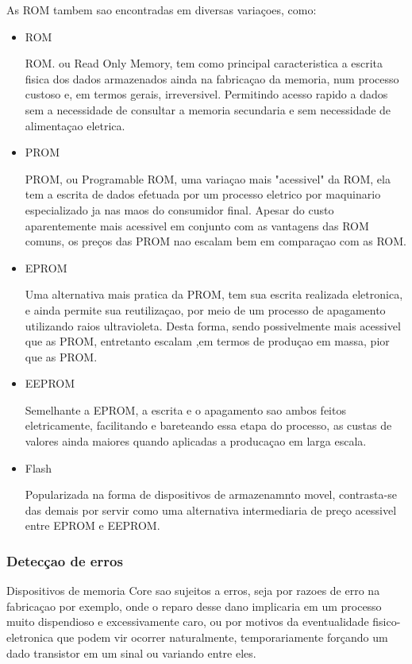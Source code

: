\documentclass[12pt]{article}
\begin{document}
As ROM tambem sao encontradas em diversas variaçoes, como:

\begin{itemize}
    \item ROM 

    ROM. ou Read Only Memory, tem como principal caracteristica a escrita fisica dos dados armazenados ainda na fabricaçao da memoria, num processo custoso e, em termos gerais, irreversivel. Permitindo acesso rapido a dados sem a necessidade de consultar a memoria secundaria e sem necessidade de alimentaçao eletrica.

    \item PROM

    PROM, ou Programable ROM, uma variaçao mais "acessivel" da ROM, ela tem a escrita de dados efetuada por um processo eletrico por maquinario especializado ja nas maos do consumidor final. Apesar do custo aparentemente mais acessivel em conjunto com as vantagens das ROM comuns, os preços das PROM nao escalam bem em comparaçao com as ROM.

    \item EPROM

    Uma alternativa mais pratica da PROM, tem sua escrita realizada eletronica, e ainda permite sua reutilizaçao, por meio de um processo de apagamento utilizando raios ultravioleta. Desta forma, sendo possivelmente mais acessivel que as PROM, entretanto escalam ,em termos de produçao em massa, pior que as PROM.

    \item EEPROM

    Semelhante a EPROM, a escrita e o apagamento sao ambos feitos eletricamente, facilitando e bareteando essa etapa do processo, as custas de valores ainda maiores quando aplicadas a producaçao em larga escala.

    \item Flash

    Popularizada na forma de dispositivos de armazenamnto movel, contrasta-se das demais por servir como uma alternativa intermediaria de preço acessivel entre EPROM e EEPROM.

\end{itemize}

\subsubsection*{Detecçao de erros}
Dispositivos de memoria Core sao sujeitos a erros, seja por razoes de erro na fabricaçao por exemplo, onde o reparo desse dano implicaria em um processo muito dispendioso e excessivamente caro, ou por motivos da eventualidade fisico-eletronica que podem vir ocorrer naturalmente, temporariamente forçando um dado transistor em um sinal ou variando entre eles. 
\end{document}
